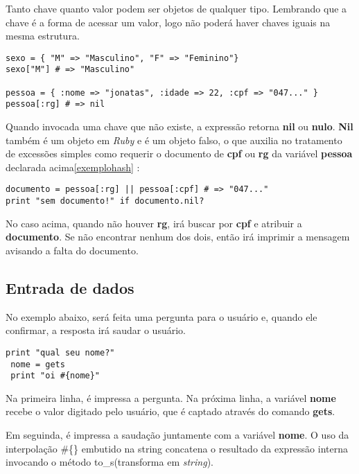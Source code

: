 \documentclass[espaco=simples,appendix=Name]{abnt}
\begin{document}
Tanto chave quanto valor podem ser objetos de qualquer tipo. Lembrando que a chave é a forma de acessar um valor, logo não poderá haver chaves iguais na mesma estrutura. 

\begin{lstlisting}[label=exemplohash, caption=Exemplos de uso de hashes]
sexo = { "M" => "Masculino", "F" => "Feminino"}
sexo["M"] # => "Masculino"

pessoa = { :nome => "jonatas", :idade => 22, :cpf => "047..." }
pessoa[:rg] # => nil
\end{lstlisting}

Quando invocada uma chave que não existe, a expressão retorna \textbf{nil} ou \textbf{nulo}. \textbf{Nil} também é um objeto em \textit{Ruby} e é um objeto falso, o que auxilia no tratamento de excessões simples como requerir o documento de \textbf{cpf} ou \textbf{rg} da variável \textbf{pessoa} declarada acima\ref{exemplohash} :

\begin{lstlisting}[caption=Exemplos de uso de hashes com operador ou ]
documento = pessoa[:rg] || pessoa[:cpf] # => "047..."
print "sem documento!" if documento.nil?
\end{lstlisting}

No caso acima, quando não houver \textbf{rg}, irá buscar por \textbf{cpf} e atribuir a \textbf{documento}. Se não encontrar nenhum dos dois, então irá imprimir a mensagem avisando a falta do documento.

\subsection { Entrada de dados }

No exemplo abaixo, será feita uma pergunta para o usuário e, quando ele confirmar, a resposta irá saudar o usuário.

\begin{lstlisting}[caption=Exemplo de entrada de dados ]
 print "qual seu nome?"
 nome = gets
 print "oi #{nome}"
\end{lstlisting}
 
Na primeira linha, é impressa a pergunta. Na próxima linha, a variável \textbf{nome} recebe o valor digitado pelo usuário, que é captado através do comando \textbf{gets}.

Em seguinda, é impressa a saudação juntamente com a variável \textbf{nome}. O uso da interpolação \#\{\} embutido na string concatena o resultado da expressão interna invocando o método to\_s(transforma em \textit{string}).
\end{document}
